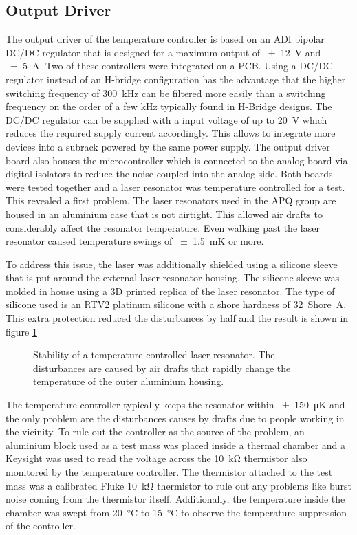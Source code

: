 \subsection{Output Driver}
The output driver of the temperature controller is based on an ADI  bipolar DC/DC regulator that is designed for a maximum output of \qty{\pm 12}{\V} and \qty{\pm 5}{\A}. Two of these controllers were integrated on a PCB. Using a DC/DC regulator instead of an H-bridge configuration has the advantage that the higher switching frequency of \qty{300}{\kHz} can be filtered more easily than a switching frequency on the order of a few \unit{\kHz} typically found in H-Bridge designs. The DC/DC regulator can be supplied with a input voltage of up to \qty{20}{\V} which reduces the required supply current accordingly. This allows to integrate more devices into a subrack powered by the same power supply. The output driver board also houses the microcontroller which is connected to the analog board via digital isolators to reduce the noise coupled into the analog side. Both boards were tested together and a laser resonator was temperature controlled for a test. This revealed a first problem. The laser resonators used in the APQ group are housed in an aluminium case that is not airtight. This allowed air drafts to considerably affect the resonator temperature. Even walking past the laser resonator caused temperature swings of \qty{\pm 1.5}{\milli \K} or more.

To address this issue, the laser was additionally shielded using a silicone sleeve that is put around the external laser resonator housing. The silicone sleeve was molded in house using a 3D printed replica of the laser resonator. The type of silicone used is an RTV2 platinum silicone with a shore hardness of \qty{32}{Shore A}. This extra protection reduced the disturbances by half and the result is shown in figure \ref{fig:dgTemp_laser_resonator}
\begin{figure}[ht]
    \centering
    \caption{Stability of a temperature controlled laser resonator. The disturbances are caused by air drafts that rapidly change the temperature of the outer aluminium housing.}
    \label{fig:dgTemp_laser_resonator}
\end{figure}

The temperature controller typically keeps the resonator within \qty{\pm 150}{\micro \K} and the only problem are the disturbances causes by drafts due to people working in the vicinity. To rule out the controller as the source of the problem, an aluminium block used as a test mass was placed inside a thermal chamber and a Keysight  was used to read the voltage across the \qty{10}{\kilo\ohm} thermistor also monitored by the temperature controller. The thermistor attached to the test mass was a calibrated Fluke  \qty{10}{\kilo\ohm} thermistor to rule out any problems like burst noise coming from the thermistor itself. Additionally, the temperature inside the chamber was swept from \qty{20}{\celsius} to \qty{15}{\celsius} to observe the temperature suppression of the controller.

